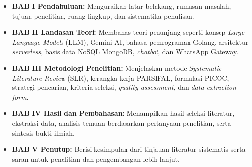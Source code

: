\begin{itemize}[leftmargin=*]
    \item \textbf{BAB I Pendahuluan:} Menguraikan latar belakang, rumusan masalah, tujuan penelitian, ruang lingkup, dan sistematika penulisan.
    \item \textbf{BAB II Landasan Teori:} Membahas teori penunjang seperti konsep \textit{Large Language Models} (LLM), Gemini AI, bahasa pemrograman Golang, arsitektur \textit{serverless}, basis data NoSQL MongoDB, \textit{chatbot}, dan WhatsApp Gateway.
    \item \textbf{BAB III Metodologi Penelitian:} Menjelaskan metode \textit{Systematic Literature Review} (SLR), kerangka kerja PARSIFAL, formulasi PICOC, strategi pencarian, kriteria seleksi, \textit{quality assessment}, dan \textit{data extraction form}.
    \item \textbf{BAB IV Hasil dan Pembahasan:} Menampilkan hasil seleksi literatur, ekstraksi data, analisis temuan berdasarkan pertanyaan penelitian, serta sintesis bukti ilmiah.
    \item \textbf{BAB V Penutup:} Berisi kesimpulan dari tinjauan literatur sistematis serta saran untuk penelitian dan pengembangan lebih lanjut.
\end{itemize}
